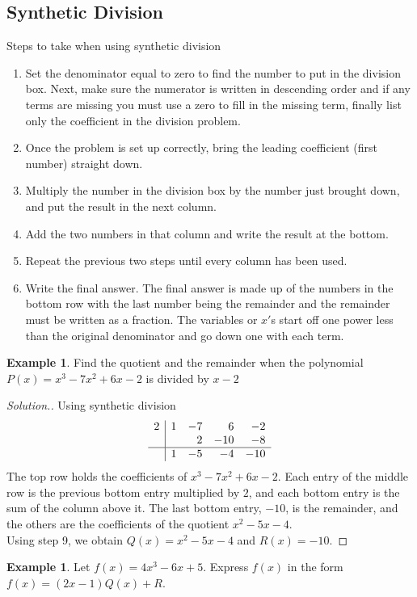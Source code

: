 \documentclass[11pt,a4paper]{article}
\theoremstyle{definition}
\newtheorem{example}[thm]{Example}
\newenvironment{solution}
  {\renewcommand{\qedsymbol}{}\begin{proof}[\textit{Solution}.]}
  {\end{proof}}
\begin{document}
\subsection{Synthetic Division}
Steps to take when using synthetic division
\begin{enumerate}
\item Set the denominator equal to zero to find the number to put in the division box. Next, make sure the numerator is written in descending order and if any terms are missing you must use a zero to fill in the missing term, finally list only the coefficient in the division problem.
\item Once the problem is set up correctly, bring the leading coefficient (first number) straight down.
\item Multiply the number in the division box by the number just brought down, and put the result in the next column.
\item Add the two numbers in that column and write the result at the bottom.
\item Repeat the previous two steps until every column has been used.
\item Write the final answer. The final answer is made up of the numbers in the bottom row with the last number being the remainder and the remainder must be written as a fraction. The variables or $x'$s start off one power less than the original denominator and go down one with each term.\\
\end{enumerate}


\begin{example}

Find the quotient and the remainder when the polynomial $P(x)=x^3-7x^2+6x-2$ is divided by $x-2$
\end{example}
\begin{solution}

Using synthetic division
$$\begin{array}{r|rrrr}
2 & 1 & -7 & 6 & -2\\
  &   & 2 & -10 & -8\\
\hline
  & 1 & -5 & -4 & -10
\end{array}$$
The top row holds the coefficients of $x^{3}-7x^{2}+6x-2$. Each entry of the
middle row is the previous bottom entry multiplied by $2$, and each bottom
entry is the sum of the column above it. The last bottom entry, $-10$, is the
remainder, and the others are the coefficients of the quotient
$x^{2}-5x-4$.\\

Using step 9, we obtain $Q(x)=x^2-5x-4$ and $R(x)=-10$.
\end{solution}
\begin{example}
Let $f(x)=4x^{3}-6x+5$. Express $f(x)$ in the form $f(x)=(2x-1)Q(x)+R$.
\end{example}
\end{document}
